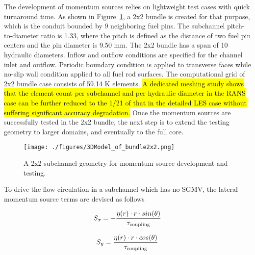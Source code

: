 The development of momentum sources relies on lightweight test cases with quick turnaround time. As shown in Figure~\ref{fig:model2x2}, a 2x2 bundle is created for that purpose, which is the conduit bounded by 9 neighboring fuel pins. The subchannel pitch-to-diameter ratio is 1.33, where the pitch is defined as the distance of two fuel pin centers and the pin diameter is 9.50 mm. The 2x2 bundle has a span of 10 hydraulic diameters. Inflow and outflow conditions are specified for the channel inlet and outflow. Periodic boundary condition is applied to transverse faces while no-slip wall condition applied to all fuel rod surfaces. The computational grid of 2x2 bundle case consists of 59.14 K elements. 
\hl{A dedicated meshing study shows that the element count per subchannel and per hydraulic diameter in the RANS case can be further reduced to the 1/21 of that in the detailed LES case without suffering significant accuracy degradation.}
Once the momentum sources are successfully tested in the 2x2 bundle, the next step is to extend the testing geometry to larger domains, and eventually to the full core.

\begin{figure}[!ht]
\centering
\texttt{[image: ./figures/3DModel\_of\_bundle2x2.png]}
\caption{A 2x2 subchannel geometry for momentum source development and testing. }
\label{fig:model2x2}
\end{figure}

To drive the flow circulation in a subchannel which has no SGMV, the lateral momentum source terms are devised as follows

\begin{equation}
  S_x = -\frac{\eta(r)\cdot r \cdot sin(\theta)}{\tau_\text{coupling}}\\
\end{equation}

\begin{equation}
  S_y =  \frac{\eta(r)\cdot r \cdot cos(\theta)}{\tau_\text{coupling}}\\
\end{equation}

